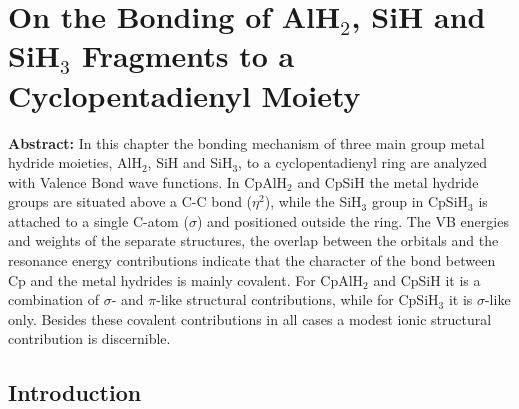 \chapter{On the Bonding of AlH$_2$, SiH and SiH$_3$ Fragments to a Cyclopentadienyl Moiety}
\label{chap_cyclopentadienyl}


\noindent\textbf{Abstract:} In this chapter the bonding mechanism of three main group metal hydride moieties, AlH$_2$, SiH and SiH$_3$, to a cyclopentadienyl ring are analyzed with Valence Bond wave functions. In CpAlH$_2$ and CpSiH the metal hydride groups are situated above a C-C bond ($\eta^2$), while the SiH$_3$ group in CpSiH$_3$ is attached to a single C-atom ($\sigma$) and positioned outside the ring. The VB energies and weights of the separate structures, the overlap between the orbitals and the resonance energy contributions indicate that the character of the bond between Cp and the metal hydrides is mainly covalent. For CpAlH$_2$ and CpSiH it is a combination of $\sigma$- and $\pi$-like structural contributions, while for CpSiH$_3$ it is $\sigma$-like only. Besides these covalent contributions in all cases a modest ionic structural contribution is discernible.

\clearpage

\section{Introduction}

